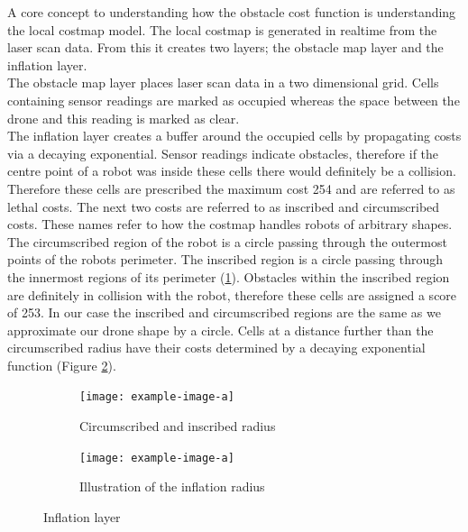 \documentclass[capstone_report.tex]{subfiles}
\begin{document}
A core concept to understanding how the obstacle cost function is understanding the local costmap model.  The local costmap is generated in realtime from the laser scan data.  From this it creates two layers; the obstacle map layer and the inflation layer. \\

The obstacle map layer places laser scan data in a two dimensional grid.  Cells containing sensor readings are marked as occupied whereas the space between the drone and this reading is marked as clear.\\

The inflation layer creates a buffer around the occupied cells by propagating costs via a decaying exponential.  Sensor readings indicate obstacles, therefore if the centre point of a robot was inside these cells there would definitely be a collision.  Therefore these cells are prescribed the maximum cost 254 and are referred to as lethal costs.  The next two costs are referred to as inscribed and circumscribed costs.  These names refer to how the costmap handles robots of arbitrary shapes.  The circumscribed region of the robot is a circle passing through the outermost points of the robots perimeter.  The inscribed region is a circle passing through the innermost regions of its perimeter (\ref{fig:circumscribed}).  Obstacles within the inscribed region are definitely in collision with the robot, therefore these cells are assigned a score of 253.  In our case the inscribed and circumscribed regions are the same as we approximate our drone shape by a circle.  Cells at a distance further than the circumscribed radius have their costs determined by a decaying exponential function (Figure \ref{fig:inflation_radius}).\\

\begin{figure}[H]
    \centering
    \begin{subfigure}{0.5\textwidth}
        \centering
        \texttt{[image: example-image-a]}
        \caption{Circumscribed and inscribed radius}
        \label{fig:circumscribed}
    \end{subfigure}%
    \begin{subfigure}{0.5\textwidth}
        \centering
        \texttt{[image: example-image-a]}
        \caption{Illustration of the inflation radius}
        \label{fig:inflation_radius}
    \end{subfigure}
    \caption{Inflation layer\label{fig:inflation_layer}}
\end{figure}
\end{document}
